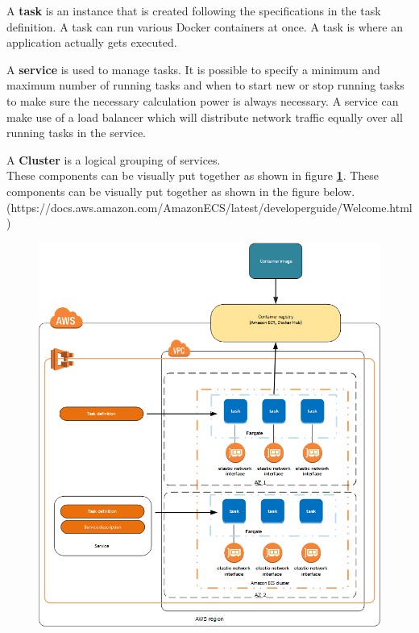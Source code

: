 A \textbf{task} is an instance that is created following the specifications in the task definition. A task can run various Docker containers at once. A task is where an application actually gets executed.

A \textbf{service} is used to manage tasks. It is possible to specify a minimum and maximum number of running tasks and when to start new or stop running tasks to make sure the necessary calculation power is always necessary. A service can make use of a load balancer which will distribute network traffic equally over all running tasks in the service.

A \textbf{Cluster} is a logical grouping of services. \\

These components can be visually put together as shown in figure \textbf{\ref{ex311}}.
These components can be visually put together as shown in the figure below. (https://docs.aws.amazon.com/AmazonECS/latest/developerguide/Welcome.html)
\begin{figure}[H]
\centering
\includegraphics[scale=.85]{Bilder/overview-fargate.png}
\label{ex311}
\end{figure}

